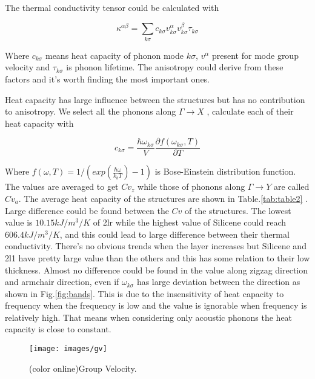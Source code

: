 \documentclass[%
 reprint,
 amsmath,amssymb,
 aps,
 prb,
]{revtex4-1}
\begin{document}
The thermal conductivity tensor could be calculated with

\begin{equation}
  \kappa^{\alpha\beta} = \sum_{k \sigma}{c_{k \sigma}v^{\alpha}_{k \sigma}v^{\beta}_{k \sigma}\tau_{k \sigma}} \label{eq:kappasum}
\end{equation}

Where $c_{k \sigma}$ means heat capacity of phonon mode $k \sigma$, $v^{\alpha}$ present for mode group velocity and $\tau_{k \sigma}$ is phonon lifetime. The anisotropy could derive from these factors and it's worth finding the most important ones.

Heat capacity has large influence between the structures but has no contribution to anisotropy. We select all the phonons along  $\Gamma\rightarrow X$ , calculate each of their heat capacity with

\begin{equation}
  c_{k \sigma}=\frac{\hbar \omega_{k \sigma} }{V} \frac{\partial f(\omega_{k \sigma},T)}{\partial T}
\end{equation}

Where $ f(\omega,T)=1/(exp(\frac{\hbar \omega}{k_b T})-1)$ is Bose-Einstein distribution function. The values are averaged to get $Cv_z$ while those of phonons along $\Gamma\rightarrow Y$ are called $Cv_a$. The average heat capacity of the structures are shown in Table.\ref{tab:table2} . Large difference could be found between the $Cv$ of the structures. The lowest value is $10.15 kJ/m^3/K$ of 2lr while the highest value of Silicene could reach $606.4 kJ/m^3/K$, and this could lead to large difference between their thermal conductivity. There's no obvious trends when the layer increases but Silicene and 2l1 have pretty large value than the others and this has some relation to their low thickness.  Almost no difference could be found in the value along zigzag direction and armchair direction, even if $\omega_{k \sigma}$ has large deviation between the direction as shown in Fig.\ref{fig:bands}. This is due to the insensitivity of heat capacity to frequency when the frequency is low and the value is ignorable when frequency is relatively high. That means when considering only acoustic phonons the heat capacity is close to constant.


\begin{figure}[b]
  \texttt{[image: images/gv]}{}
  \caption{\label{fig:gv} (color online)Group Velocity.}
\end{figure}
\end{document}
